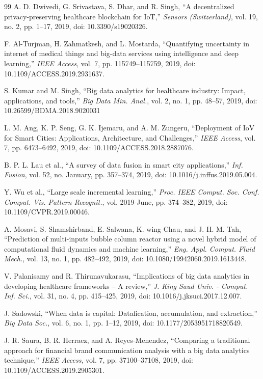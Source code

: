 \documentclass{iaesarticle}
\begin{document}
\begin{thebibliography} {99}
 A. D. Dwivedi, G. Srivastava, S. Dhar, and R. Singh, “A decentralized privacy-preserving healthcare blockchain for IoT,” \textsl{Sensors (Switzerland)}, vol. 19, no. 2, pp. 1–17, 2019, doi: 10.3390/s19020326.

 F. Al-Turjman, H. Zahmatkesh, and L. Mostarda, “Quantifying uncertainty in internet of medical things and big-data services using intelligence and deep learning,” \textsl{IEEE Access}, vol. 7, pp. 115749–115759, 2019, doi: 10.1109/ACCESS.2019.2931637.

 S. Kumar and M. Singh, “Big data analytics for healthcare industry: Impact, applications, and tools,” \textsl{Big Data Min. Anal.}, vol. 2, no. 1, pp. 48–57, 2019, doi: 10.26599/BDMA.2018.9020031

 L. M. Ang, K. P. Seng, G. K. Ijemaru, and A. M. Zungeru, “Deployment of IoV for Smart Cities: Applications, Architecture, and Challenges,” \textsl{IEEE Access}, vol. 7, pp. 6473–6492, 2019, doi: 10.1109/ACCESS.2018.2887076.

 B. P. L. Lau et al., “A survey of data fusion in smart city applications,” \textsl{Inf. Fusion}, vol. 52, no. January, pp. 357–374, 2019, doi: 10.1016/j.inffus.2019.05.004.

 Y. Wu et al., “Large scale incremental learning,” \textsl{Proc. IEEE Comput. Soc. Conf. Comput. Vis. Pattern Recognit.}, vol. 2019-June, pp. 374–382, 2019, doi: 10.1109/CVPR.2019.00046.

 A. Mosavi, S. Shamshirband, E. Salwana, K. wing Chau, and J. H. M. Tah, “Prediction of multi-inputs bubble column reactor using a novel hybrid model of computational fluid dynamics and machine learning,” \textsl{Eng. Appl. Comput. Fluid Mech.}, vol. 13, no. 1, pp. 482–492, 2019, doi: 10.1080/19942060.2019.1613448.

 V. Palanisamy and R. Thirunavukarasu, “Implications of big data analytics in developing healthcare frameworks – A review,” \textsl{J. King Saud Univ. - Comput. Inf. Sci.}, vol. 31, no. 4, pp. 415–425, 2019, doi: 10.1016/j.jksuci.2017.12.007.

 J. Sadowski, “When data is capital: Datafication, accumulation, and extraction,” \textsl{Big Data Soc.}, vol. 6, no. 1, pp. 1–12, 2019, doi: 10.1177/2053951718820549.

 J. R. Saura, B. R. Herraez, and A. Reyes-Menendez, “Comparing a traditional approach for financial brand communication analysis with a big data analytics technique,” \textsl{IEEE Access}, vol. 7, pp. 37100–37108, 2019, doi: 10.1109/ACCESS.2019.2905301.


\end{thebibliography}
\end{document}
